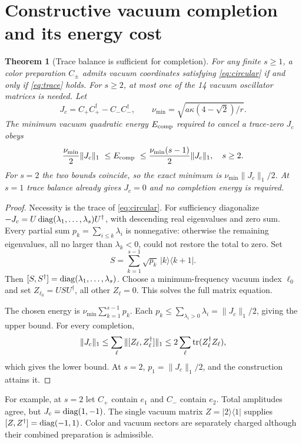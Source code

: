 \documentclass[11pt,a4paper]{article}
\newtheorem{theorem}{Theorem}\newtheorem{lemma}[theorem]{Lemma}\newtheorem{proposition}[theorem]{Proposition}
\begin{document}
\section{Constructive vacuum completion and its energy cost}
\begin{theorem}[Trace balance is sufficient for completion]\label{th:completion}
For any finite $s\ge1$, a color preparation $C_\pm$ admits vacuum coordinates satisfying \eqref{eq:circular} if and only if \eqref{eq:trace} holds. For $s\ge2$, at most one of the 14 vacuum oscillator matrices is needed. Let
\[
J_c=C_+C_+^\dagger-C_-C_-^\dagger,\qquad
\nu_{\min}=\sqrt{a\kappa(4-\sqrt2)/r}.
\]
The minimum vacuum quadratic energy $E_{\rm comp}$ required to cancel a trace-zero $J_c$ obeys
\begin{equation}
\frac{\nu_{\min}}2\|J_c\|_1\ \le E_{\rm comp}\ \le
\frac{\nu_{\min}(s-1)}2\|J_c\|_1,\quad s\ge2.\label{eq:cost}
\end{equation}
For $s=2$ the two bounds coincide, so the exact minimum is $\nu_{\min}\|J_c\|_1/2$. At $s=1$ trace balance already gives $J_c=0$ and no completion energy is required.
\end{theorem}
\begin{proof}
Necessity is the trace of \eqref{eq:circular}. For sufficiency diagonalize $-J_c=U\operatorname{diag}(\lambda_1,\ldots,\lambda_s)U^\dagger$, with descending real eigenvalues and zero sum. Every partial sum $p_k=\sum_{i\le k}\lambda_i$ is nonnegative: otherwise the remaining eigenvalues, all no larger than $\lambda_k<0$, could not restore the total to zero. Set
\[
S=\sum_{k=1}^{s-1}\sqrt{p_k}\,|k\rangle\langle k+1|.
\]
Then $[S,S^\dagger]=\operatorname{diag}(\lambda_1,\ldots,\lambda_s)$. Choose a minimum-frequency vacuum index $\ell_0$ and set $Z_{\ell_0}=USU^\dagger$, all other $Z_\ell=0$. This solves the full matrix equation.

The chosen energy is $\nu_{\min}\sum_{k=1}^{s-1}p_k$. Each $p_k\le\sum_{\lambda_i>0}\lambda_i=\|J_c\|_1/2$, giving the upper bound. For every completion,
\[
\|J_c\|_1\le\sum_\ell\|[Z_\ell,Z_\ell^\dagger]\|_1
\le2\sum_\ell\operatorname{tr}(Z_\ell^\dagger Z_\ell),
\]
which gives the lower bound. At $s=2$, $p_1=\|J_c\|_1/2$, and the construction attains it.
\end{proof}
For example, at $s=2$ let $C_+$ contain $e_1$ and $C_-$ contain $e_2$. Total amplitudes agree, but $J_c=\operatorname{diag}(1,-1)$. The single vacuum matrix $Z=|2\rangle\langle1|$ supplies $[Z,Z^\dagger]=\operatorname{diag}(-1,1)$. Color and vacuum sectors are separately charged although their combined preparation is admissible.
\end{document}
